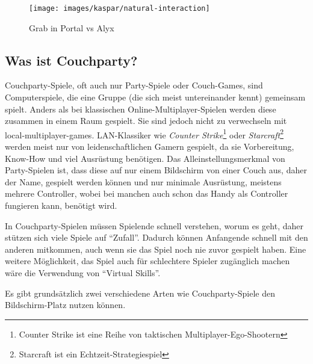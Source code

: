 \begin{figure}[H]
	\centering
	\texttt{[image: images/kaspar/natural-interaction]}
	\caption{Grab in Portal\cite{_grab_portal} vs Alyx\cite{_grab_alyx}}
\end{figure}

\subsection{Was ist Couchparty?\label{_party_games}}

Couchparty-Spiele, oft auch nur Party-Spiele oder Couch-Games, sind Computerspiele, die eine Gruppe (die sich meist untereinander kennt) gemeinsam spielt. Anders als bei klassischen Online-Multiplayer-Spielen werden diese zusammen in einem Raum gespielt. Sie sind jedoch nicht zu verwechseln mit local-multiplayer-games. LAN-Klassiker wie \emph{Counter Strike}\footnote{Counter Strike ist eine Reihe von taktischen Multiplayer-Ego-Shootern} oder \emph{Starcraft}\footnote{Starcraft ist ein Echtzeit-Strategiespiel} werden meist nur von leidenschaftlichen Gamern gespielt, da sie Vorbereitung, Know-How und viel Ausrüstung benötigen. Das Alleinstellungsmerkmal von Party-Spielen ist, dass diese auf nur einem Bildschirm von einer Couch aus, daher der Name, gespielt werden können und nur minimale Ausrüstung, meistens mehrere Controller, wobei bei manchen auch schon das Handy als Controller fungieren kann, benötigt wird.

In Couchparty-Spielen müssen Spielende schnell verstehen, worum es geht, daher stützen sich viele Spiele auf "`Zufall"'. Dadurch können Anfangende schnell mit den anderen mitkommen, auch wenn sie das Spiel noch nie zuvor gespielt haben. Eine weitere Möglichkeit, das Spiel auch für schlechtere Spieler zugänglich machen wäre die Verwendung von "`Virtual Skills"'\cite[S. 165]{_art_of_gamedesign}.

Es gibt grundsätzlich zwei verschiedene Arten wie Couchparty-Spiele den Bildschirm-Platz nutzen können.

